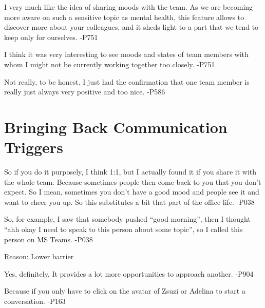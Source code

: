 \begin{displayquote}
    I very much like the idea of sharing moods with the team. As we are becoming more aware on such a sensitive topic as mental health, this feature allows to discover more about your colleagues, and it sheds light to a part that we tend to keep only for ourselves. -P751
\end{displayquote}

\begin{displayquote}
    I think it was very interesting to see moods and states of team members with whom I might not be currently working together too closely. -P751
\end{displayquote}

\begin{displayquote}
    Not really, to be honest. I just had the confirmation that one team member is really just always very positive and too nice. -P586
\end{displayquote}

\section{Bringing Back Communication Triggers}

\begin{displayquote}
    So if you do it purposely, I think 1:1, but I actually found it if you share it with the whole team. Because sometimes people then come back to you that you don't expect. So I mean, sometimes you don't have a good mood and people see it and want to cheer you up. So this substitutes a bit that part of the office life. -P038
\end{displayquote}

\begin{displayquote}
    So, for example, I saw that somebody pushed \enquote{good morning}, then I thought \enquote{ahh okay I need to speak to this person about some topic}, so I called this person on MS Teams. -P038
\end{displayquote}

Reason: Lower barrier

\begin{displayquote}
    Yes, definitely. It provides a lot more opportunities to approach another. -P904
\end{displayquote}

\begin{displayquote}
    Because if you only have to click on the avatar of Zsuzi or Adelina to start a conversation. -P163
\end{displayquote}

